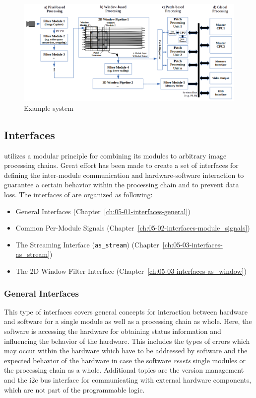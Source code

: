
\begin{figure}[ht]
    \noindent \begin{centering}
        \includegraphics[width=15cm]{figs/01-asterics-example}
        \par\end{centering}
    \caption{Example \asterics system\label{fig:01-asterics-example}}
\end{figure}


\subsection{Interfaces}
\asterics utilizes a modular principle for combining its modules to arbitrary image processing chains.
Great effort has been made to create a set of interfaces for defining the inter-module communication and hardware-software interaction to guarantee a certain behavior within the processing chain and to prevent data loss. 
The interfaces of \asterics are organized as following:

\begin{itemize}
    \item General Interfaces (Chapter~\ref{ch:05-01-interfaces-general})
    \item Common Per-Module Signals (Chapter~\ref{ch:05-02-interfaces-module_signals})
    \item The \asterics Streaming Interface (\texttt{as\_stream}) (Chapter~\ref{ch:05-03-interfaces-as_stream})
    \item The \asterics 2D Window Filter Interface (Chapter~\ref{ch:05-03-interfaces-as_window})
\end{itemize}

\subsubsection{General Interfaces}
This type of interfaces covers general concepts for interaction between hardware and software for a single module as well as a processing chain as whole.
Here, the software is accessing the hardware for obtaining status information and influencing the behavior of the hardware.
This includes the types of errors which may occur within the hardware which have to be addressed by software and the expected behavior of the hardware in case the software \textit{resets} single modules or the processing chain as a whole.
Additional topics are the version management and the i2c bus interface for communicating with external hardware components, which are not part of the programmable logic.

